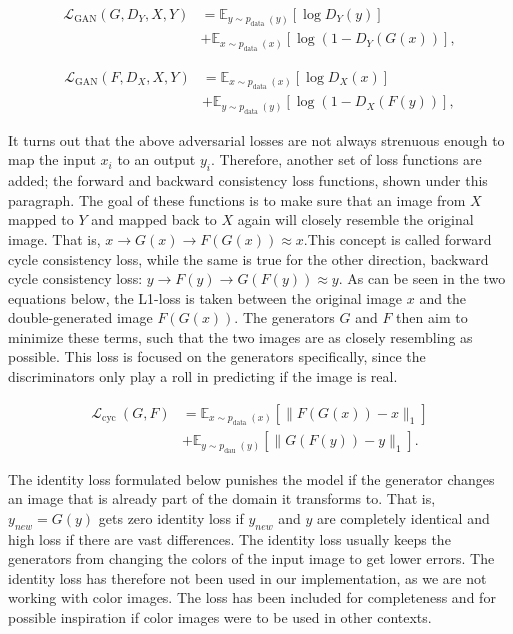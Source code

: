 \documentclass[12pt, fleqn, titlepage]{article}
\newcommand{\1}[1]{\mathds{1}\left[#1\right]}
\begin{document}
\[\begin{aligned}
	\mathcal{L}_{\mathrm{GAN}}\left(G, D_{Y}, X, Y\right) &=\mathbb{E}_{y \sim p_{\text {data }}(y)}\left[\log D_{Y}(y)\right] \\
	&+\mathbb{E}_{x \sim p_{\text {data }}(x)}\left[\log \left(1-D_{Y}(G(x))\right],\right.
\end{aligned}\]

\[\begin{aligned}
	\mathcal{L}_{\mathrm{GAN}}\left(F, D_{X}, X, Y\right) &=\mathbb{E}_{x \sim p_{\text {data }}(x)}\left[\log D_{X}(x)\right] \\
	&+\mathbb{E}_{y \sim p_{\text {data }}(y)}\left[\log \left(1-D_{X}(F(y))\right],\right.
\end{aligned}\]

It turns out that the above adversarial losses are not always strenuous enough to map the input $x_i$ to an output $y_i$. Therefore, another set of loss functions are added; the forward and backward consistency loss functions, shown under this paragraph. The goal of these functions is to make sure that an image from $X$ mapped to $Y$ and mapped back to $X$ again will closely resemble the original image. That is, $x \rightarrow G(x) \rightarrow F(G(x)) \approx x$.This concept is called forward cycle consistency loss, while the same is true for the other direction, backward cycle consistency loss: $y \rightarrow F(y) \rightarrow G(F(y)) \approx y$. As can be seen in the two equations below, the L1-loss is taken between the original image $x$ and the double-generated image $F(G(x))$. The generators $G$ and $F$ then aim to minimize these terms, such that the two images are as closely resembling as possible. This loss is focused on the generators specifically, since the discriminators only play a roll in predicting if the image is real.

\[\begin{aligned}
	\mathcal{L}_{\text {cyc }}(G, F) &=\mathbb{E}_{x \sim p_{\text {data }}(x)}\left[\|F(G(x))-x\|_{1}\right] \\
	&+\mathbb{E}_{y \sim p_{\text {dau }}(y)}\left[\|G(F(y))-y\|_{1}\right] .
\end{aligned}\]

The identity loss formulated below punishes the model if the generator changes an image that is already part of the domain it transforms to. That is, $y_{new} = G(y)$ gets zero identity loss if $y_{new}$ and $y$ are completely identical and high loss if there are vast differences. The identity loss usually keeps the generators from changing the colors of the input image to get lower errors. The identity loss has therefore not been used in our implementation, as we are not working with color images. The loss has been included for completeness and for possible inspiration if color images were to be used in other contexts.
\end{document}
